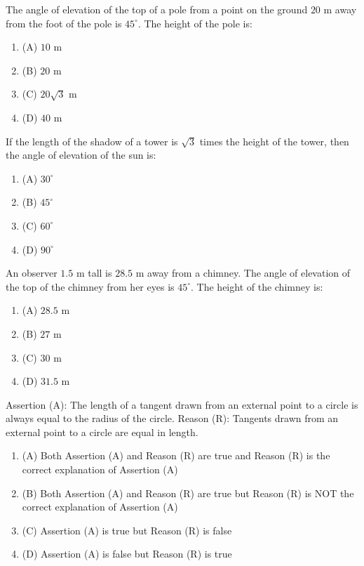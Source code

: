 \documentclass[12pt,a4paper]{exam}
\begin{document}
\begin{questions}
\question[1] The angle of elevation of the top of a pole from a point on the ground $20$ m away from the foot of the pole is $45^\circ$. The height of the pole is:
\begin{enumerate}[label=(\Alph*)]
  \item (A) $10$ m
  \item (B) $20$ m
  \item (C) $20\sqrt{3}$ m
  \item (D) $40$ m
\end{enumerate}
\vspace{0.15cm}

\question[1] If the length of the shadow of a tower is $\sqrt{3}$ times the height of the tower, then the angle of elevation of the sun is:
\begin{enumerate}[label=(\Alph*)]
  \item (A) $30^\circ$
  \item (B) $45^\circ$
  \item (C) $60^\circ$
  \item (D) $90^\circ$
\end{enumerate}
\vspace{0.15cm}

\question[1] An observer $1.5$ m tall is $28.5$ m away from a chimney. The angle of elevation of the top of the chimney from her eyes is $45^\circ$. The height of the chimney is:
\begin{enumerate}[label=(\Alph*)]
  \item (A) $28.5$ m
  \item (B) $27$ m
  \item (C) $30$ m
  \item (D) $31.5$ m
\end{enumerate}
\vspace{0.15cm}

\question[1] Assertion (A): The length of a tangent drawn from an external point to a circle is always equal to the radius of the circle. Reason (R): Tangents drawn from an external point to a circle are equal in length.
\begin{enumerate}[label=(\Alph*)]
  \item (A) Both Assertion (A) and Reason (R) are true and Reason (R) is the correct explanation of Assertion (A)
  \item (B) Both Assertion (A) and Reason (R) are true but Reason (R) is NOT the correct explanation of Assertion (A)
  \item (C) Assertion (A) is true but Reason (R) is false
  \item (D) Assertion (A) is false but Reason (R) is true
\end{enumerate}
\vspace{0.15cm}


\end{questions}
\end{document}
